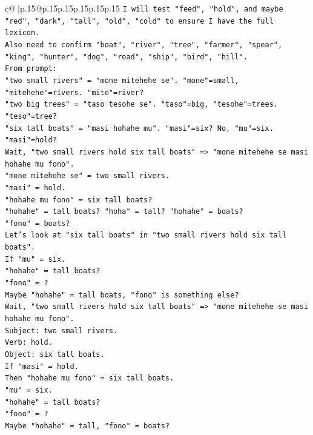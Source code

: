 \documentclass{article}
\begin{document}
{\begin{supertabular}{c@{$\;$}|p{.15\linewidth}@{}p{.15\linewidth}p{.15\linewidth}p{.15\linewidth}p{.15\linewidth}p{.15\linewidth}}
{{{\texttt{I will test "feed", "hold", and maybe "red", "dark", "tall", "old", "cold" to ensure I have the full lexicon.} \\
\texttt{Also need to confirm "boat", "river", "tree", "farmer", "spear", "king", "hunter", "dog", "road", "ship", "bird", "hill".} \\
\texttt{From prompt:} \\
\texttt{"two small rivers" = "mone mitehehe se". "mone"=small, "mitehehe"=rivers. "mite"=river?} \\
\texttt{"two big trees" = "taso tesohe se". "taso"=big, "tesohe"=trees. "teso"=tree?} \\
\texttt{"six tall boats" = "masi hohahe mu". "masi"=six? No, "mu"=six. "masi"=hold?} \\
\texttt{Wait, "two small rivers hold six tall boats" => "mone mitehehe se masi hohahe mu fono".} \\
\texttt{"mone mitehehe se" = two small rivers.} \\
\texttt{"masi" = hold.} \\
\texttt{"hohahe mu fono" = six tall boats?} \\
\texttt{"hohahe" = tall boats? "hoha" = tall? "hohahe" = boats?} \\
\texttt{"fono" = boats?} \\
\texttt{Let's look at "six tall boats" in "two small rivers hold six tall boats".} \\
\texttt{If "mu" = six.} \\
\texttt{"hohahe" = tall boats?} \\
\texttt{"fono" = ?} \\
\texttt{Maybe "hohahe" = tall boats, "fono" is something else?} \\
\texttt{Wait, "two small rivers hold six tall boats" => "mone mitehehe se masi hohahe mu fono".} \\
\texttt{Subject: two small rivers.} \\
\texttt{Verb: hold.} \\
\texttt{Object: six tall boats.} \\
\texttt{If "masi" = hold.} \\
\texttt{Then "hohahe mu fono" = six tall boats.} \\
\texttt{"mu" = six.} \\
\texttt{"hohahe" = tall boats?} \\
\texttt{"fono" = ?} \\
\texttt{Maybe "hohahe" = tall, "fono" = boats?} \\
}}}
\end{supertabular}}
\end{document}
